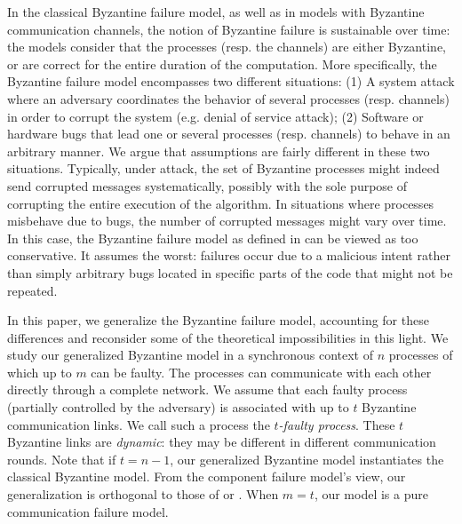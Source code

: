 \documentclass[11pt]{article}
\newcommand{\tmem}[1]{{\em #1\/}}
\begin{document}
In the classical Byzantine failure model, as well as in models with Byzantine communication channels, the notion of Byzantine failure is sustainable over time: the models consider that the processes (resp. the channels) are either Byzantine, or are correct for the entire duration of the computation. More specifically, the Byzantine failure model encompasses two different situations: (1) A system attack where an adversary coordinates the behavior of several processes (resp. channels) in order to corrupt the system (e.g. denial of service attack); (2) Software or hardware bugs that lead one or several processes (resp. channels) to behave in an arbitrary manner.
We argue that
assumptions are fairly different in these two situations. Typically, under
attack, the set of Byzantine processes might indeed send corrupted messages systematically, possibly
with the sole purpose of corrupting the entire execution of the algorithm. In situations where processes misbehave due to bugs, the number of corrupted messages might vary over time. In this case, the Byzantine failure model as defined in \cite{lamport1982byzantine,pease1980reaching} can be viewed as too conservative. It assumes the worst: failures occur due to a malicious intent rather than simply arbitrary bugs located in specific parts of the code that might not be
repeated.

In this paper, we generalize the Byzantine failure model, accounting
for these differences and reconsider some of the theoretical impossibilities in
this light. We study our generalized Byzantine model in a synchronous context
of $n$
processes of which up to $m$ can be faulty. The processes can
communicate with each other directly through a complete network.
We assume that each faulty process (partially controlled by
the adversary) is associated with up to $t$ Byzantine communication
links. We call such a process the
{\tmem{$t$-faulty process}}.
These $t$ Byzantine links are \tmem{dynamic}: they may be
different in different communication rounds.
Note that if $t=n-1$, our generalized Byzantine model instantiates the classical Byzantine model. From the component failure model's view, our generalization is orthogonal to those of \cite{tseng2013iterative} or \cite{santoro2007agreement}. When $m=t$, our model is a pure communication failure model. 
\end{document}

